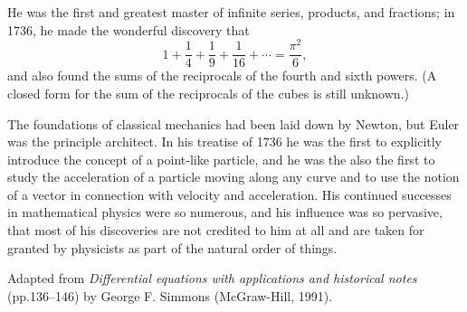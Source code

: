 He was the first and greatest master of infinite series, products, and fractions; in 1736, he made the wonderful discovery that
\begin{displaymath}
  1 + \frac{1}{4} + \frac{1}{9} + \frac{1}{16} + \cdots = \frac{\pi^2}{6},
\end{displaymath}
and also found the sums of the reciprocals of the fourth and sixth powers. (A closed form for the sum of the reciprocals of the
cubes is still unknown.)

The foundations of classical mechanics had been laid down by Newton, but Euler was the principle architect. In his treatise of 1736
he was the first to explicitly introduce the concept of a point-like particle, and he was the also the first to study the acceleration
of a particle moving along any curve and to use the notion of a vector in connection with velocity and acceleration. His continued
successes in mathematical physics were so numerous, and his influence was so pervasive, that most of his discoveries are not credited
to him at all and are taken for granted by physicists as part of the natural order of things.

\begin{flushright}
  Adapted from \textit{Differential equations with applications and historical notes} (pp.136--146) by George F. Simmons (McGraw-Hill, 1991).
\end{flushright}

\clearpage
